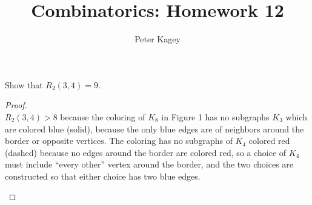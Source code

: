 \documentclass{article}
\newenvironment{problem}[2][Problem]{\begin{trivlist}
\item[\hskip \labelsep {\bfseries #1}\hskip \labelsep {\bfseries #2.}]}{\end{trivlist}}
\begin{document}
\title{Combinatorics: Homework 12}
\author{Peter Kagey}

\maketitle

\begin{problem}{1}
  Show that $R_2(3,4) = 9$.
\end{problem}

\begin{proof} $ $ \\
  $R_2(3,4) > 8$ because the coloring of $K_8$ in Figure 1 has no subgraphs
  $K_3$ which are colored blue (solid), because the only blue edges are of neighbors
  around the border or opposite vertices. The coloring has no subgraphs of $K_4$
  colored red (dashed) because no edges around the border are colored red, so a choice
  of $K_4$ must include ``every other'' vertex around the border, and the two
  choices are constructed so that either choice has two blue edges.
  \begin{figure}[h]
    \center
\end{figure}
\end{proof}
\end{document}
